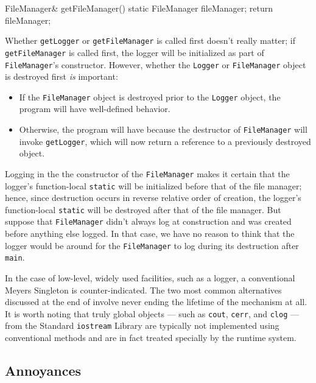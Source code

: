 \begin{emcppslisting}[emcppsbatch=e15]
FileManager& getFileManager()
{
    static FileManager fileManager;
    return fileManager;
}
\end{emcppslisting}

\noindent Whether \lstinline!getLogger! or \lstinline!getFileManager! is called first
doesn't really matter; if \lstinline!getFileManager! is called first, the
logger will be initialized as part of \lstinline!FileManager!'s
constructor. However, whether the \lstinline!Logger! or
\lstinline!FileManager! object is destroyed first \emph{is} important:

\begin{itemize}
\item{If the \lstinline!FileManager! object is destroyed prior to the \lstinline!Logger! object, the program will have well-defined behavior.}
\item{Otherwise, the program will have  because the destructor of \lstinline!FileManager! will invoke \lstinline!getLogger!, which will now return a reference to a previously destroyed object.}
\end{itemize}

Logging in the the constructor of the \lstinline!FileManager! 
makes it certain that the logger's function-local
\lstinline!static! will be initialized before that of the file manager;
hence, since destruction occurs in reverse relative order of creation,
the logger's function-local \lstinline!static! will be destroyed after that
of the file manager. But suppose that \lstinline!FileManager! didn't always
log at construction and was created before anything else logged. In that
case, we have no reason to think that the logger would be around for the
\lstinline!FileManager! to log during its destruction after \lstinline!main!.

In the case of low-level, widely used facilities, such as a logger, a
conventional Meyers Singleton is counter-indicated. The two most common
alternatives discussed at the end of  involve never ending the lifetime of
the mechanism at all. It is worth noting that truly global objects ---
such as \lstinline!cout!, \lstinline!cerr!, and \lstinline!clog! --- from the
Standard \lstinline!iostream! Library are typically not implemented using
conventional methods and are in fact treated specially by the runtime system.

\subsection[Annoyances]{Annoyances}\label{annoyances}

